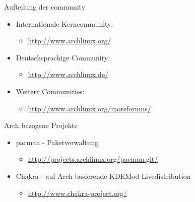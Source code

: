 

\begin{slide}{Aufteilung der community}
	\begin{itemize}
		\item{Internationale Kerncommunity:
			\begin{itemize}
				\item{\url{http://www.archlinux.org/}}
			\end{itemize}
		}
		\item{Deutschsprachige Community:
			\begin{itemize}
				\item{\url{http://www.archlinux.de/}}
			\end{itemize}
		}
		\item{Weitere Communities:
			\begin{itemize}
				\item{\url{http://www.archlinux.org/moreforums/}}
			\end{itemize}
		}
	\end{itemize}
\end{slide}

\begin{slide}{Arch bezogene Projekte}
	\begin{itemize}
		\item{pacman - Paketverwaltung
			\begin{itemize}
				\item{\url{http://projects.archlinux.org/pacman.git/}}
			\end{itemize}
		}
		\item{Chakra - auf Arch basierende KDEMod Livedistribution
			\begin{itemize}
				\item{\url{http://www.chakra-project.org/}}
			\end{itemize}
		}
	\end{itemize}
\end{slide}

